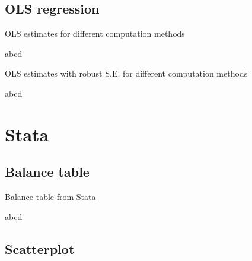 \documentclass{article}
\begin{document}
\subsection{OLS regression}

\begin{table}[H]\centering
\begin{threeparttable}
    \caption{OLS estimates for different computation methods}
    \label{t3:ols}
    
    \begin{tablenotes}
    \small \item abcd
    \end{tablenotes}
\end{threeparttable}
\end{table}

\begin{table}[H]\centering
    \begin{threeparttable}
        \caption{OLS estimates with robust S.E. for different computation methods}
        \label{t4:ols_robust}
        
        \begin{tablenotes}
        \small \item abcd
        \end{tablenotes}
    \end{threeparttable}
    \end{table}

\section{Stata}

\subsection{Balance table}

\begin{table}[H]\centering
\begin{threeparttable}
    \caption{Balance table from Stata}
    \label{t4:balance}
    
    \begin{tablenotes}
    \small \item abcd
    \end{tablenotes}
\end{threeparttable}
\end{table}

\subsection{Scatterplot}
\end{document}
